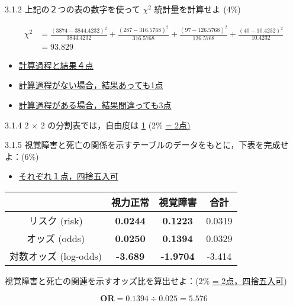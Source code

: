 \documentclass[11pt,]{problemset}
\begin{document}
\bigskip\bigskip\bigskip\bigskip\bigskip

3.1.2 上記の２つの表の数字を使って \(\chi^2\) 統計量を計算せよ (4\%)

\[
\begin{aligned}
\chi^2 & = \frac{(3874 - 3844.4232)^2}{3844.4232} + \frac{(287 - 316.5768)^2}{316.5768} + \frac{(97 - 126.5768)^2}{126.5768} + \frac{(40 - 10.4232)^2}{10.4232} \\
       & = 93.829
\end{aligned}
\]

\begin{itemize}
\item
  \underline{計算過程と結果４点}
\item
  \underline{計算過程がない場合，結果あっても1点}
\item
  \underline{計算過程がある場合，結果間違っても3点}
\end{itemize}

\bigskip\bigskip\bigskip\bigskip\bigskip
\bigskip\bigskip\bigskip\bigskip\bigskip

3.1.4 2 \(\times\) 2 の分割表では，自由度は \underline{1} (2\%
\underline{ = 2点)}

\newpage

3.1.5
視覚障害と死亡の関係を示すテーブルのデータをもとに，下表を完成せよ：(6\%)

\bigskip\bigskip

\begin{itemize}
\item
  \underline{それぞれ１点，四捨五入可}
\end{itemize}

\begin{center}
\begin{tabular}{|c|c|c|c|}
\hline
                 & 視力正常   & 視覚障害    & 合計   \\ \hline
リスク (risk)       & \bf{0.0244} & \bf{0.1223}  & 0.0319 \\ \hline
オッズ (odds)       & \bf{0.0250} & \bf{0.1394}  & 0.0329 \\ \hline
対数オッズ (log-odds) & \bf{-3.689} & \bf{-1.9704} & -3.414 \\ \hline
\end{tabular}
\end{center}

\bigskip

視覚障害と死亡の関連を示すオッズ比を算出せよ：(2\%
\underline{ = 2点，四捨五入可)}

\[
\mathbf{OR} = 0.1394 \div 0.025 = 5.576
\]
\end{document}
